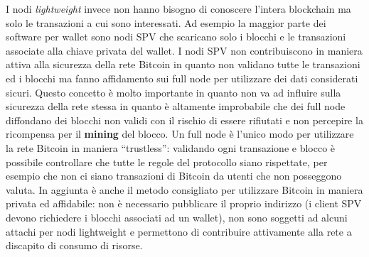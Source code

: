 I nodi \textit{lightweight} invece non hanno bisogno di conoscere l'intera blockchain ma solo le transazioni a cui sono interessati. Ad esempio la maggior parte dei software per wallet sono nodi SPV che scaricano solo i blocchi e le transazioni associate alla chiave privata del wallet.\newline
I nodi SPV non contribuiscono in maniera attiva alla sicurezza della rete Bitcoin in quanto non validano tutte le transazioni ed i blocchi ma fanno affidamento sui full node per utilizzare dei dati considerati sicuri. Questo concetto è molto importante in quanto non va ad influire sulla sicurezza della rete stessa in quanto è altamente improbabile che dei full node diffondano dei blocchi non validi con il rischio di essere rifiutati e non percepire la ricompensa per il \textbf{mining} del blocco.\newline
Un full node è l'unico modo per utilizzare la rete Bitcoin in maniera ``trustless'': validando ogni transazione e blocco è possibile controllare che tutte le regole del protocollo siano rispettate, per esempio che non ci siano transazioni di Bitcoin da utenti che non posseggono valuta. In aggiunta è anche il metodo consigliato per utilizzare Bitcoin in maniera privata ed affidabile: non è necessario pubblicare il proprio indirizzo (i client SPV devono richiedere i blocchi associati ad un wallet), non sono soggetti ad alcuni attachi per nodi lightweight e permettono di contribuire attivamente alla rete a discapito di consumo di risorse.

